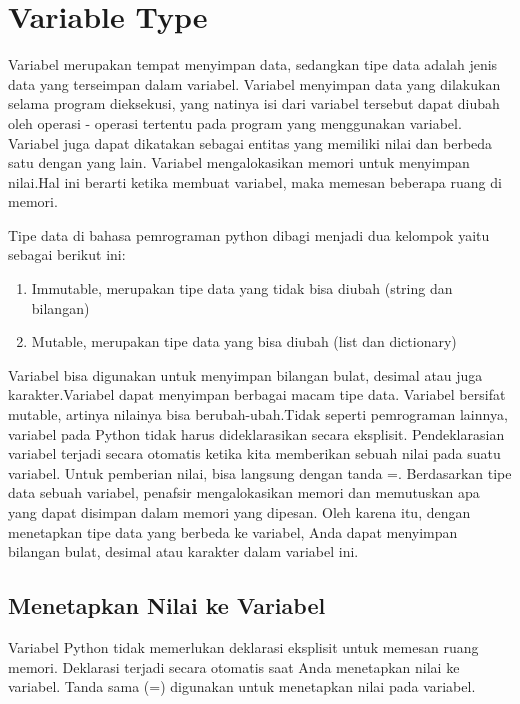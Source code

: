 

\section{Variable Type}
Variabel merupakan tempat menyimpan data, sedangkan tipe data adalah jenis data yang terseimpan dalam variabel. Variabel menyimpan data yang dilakukan selama program dieksekusi, yang natinya isi dari variabel tersebut dapat diubah oleh operasi - operasi tertentu pada program yang menggunakan variabel. Variabel juga dapat dikatakan sebagai entitas yang memiliki nilai dan berbeda satu dengan yang lain. Variabel mengalokasikan memori untuk menyimpan nilai.Hal ini berarti ketika membuat variabel, maka  memesan beberapa ruang di memori. 

Tipe data di bahasa pemrograman python dibagi menjadi dua kelompok yaitu sebagai berikut ini:
\begin{enumerate}
	\item Immutable, merupakan tipe data yang tidak bisa diubah (string dan bilangan)
	\item Mutable, merupakan tipe data yang bisa diubah (list dan dictionary)
\end{enumerate}  

Variabel bisa digunakan untuk menyimpan bilangan bulat, desimal atau juga karakter.Variabel dapat menyimpan berbagai macam tipe data. Variabel bersifat mutable, artinya nilainya bisa berubah-ubah.Tidak seperti pemrograman lainnya, variabel pada Python tidak harus dideklarasikan secara eksplisit. Pendeklarasian variabel terjadi secara otomatis ketika kita memberikan sebuah nilai pada suatu variabel. Untuk pemberian nilai, bisa langsung dengan tanda =. Berdasarkan tipe data sebuah variabel, penafsir mengalokasikan memori dan memutuskan apa yang dapat disimpan dalam memori yang dipesan. Oleh karena itu, dengan menetapkan tipe data yang berbeda ke variabel, Anda dapat menyimpan bilangan bulat, desimal atau karakter dalam variabel ini.

\subsection{Menetapkan Nilai ke Variabel}
Variabel Python tidak memerlukan deklarasi eksplisit untuk memesan ruang memori. Deklarasi terjadi secara otomatis saat Anda menetapkan nilai ke variabel. Tanda sama (=) digunakan untuk menetapkan nilai pada variabel.

